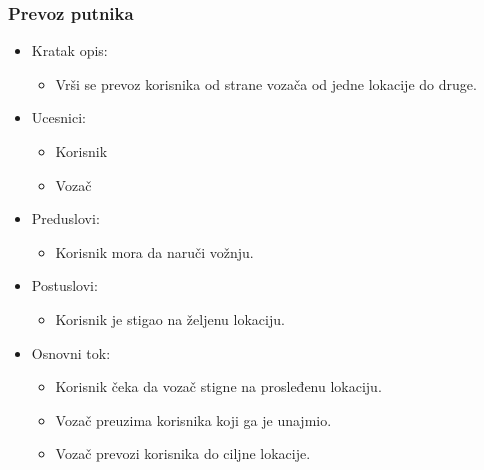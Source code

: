 \subsubsection{\bfseries Prevoz putnika}
\begin{itemize}
	\item Kratak opis:
		\begin{itemize}
			\item Vrši se prevoz korisnika od strane vozača od jedne lokacije do druge.
		\end{itemize}
 
	\item Ucesnici:
		\begin{itemize}
		    \item Korisnik
		    \item Vozač
		\end{itemize}				

	\item Preduslovi:
		\begin{itemize}
		    \item Korisnik mora da naruči vožnju.
		\end{itemize}

	\item Postuslovi:
		\begin{itemize}
			\item Korisnik je stigao na željenu lokaciju.
		\end{itemize}		


	\item Osnovni tok:
		\begin{itemize}
		    \item Korisnik čeka da vozač stigne na prosleđenu lokaciju.
		    \item Vozač preuzima korisnika koji ga je unajmio.  
		    \item Vozač prevozi korisnika do ciljne lokacije.
		\end{itemize}
\end{itemize}

